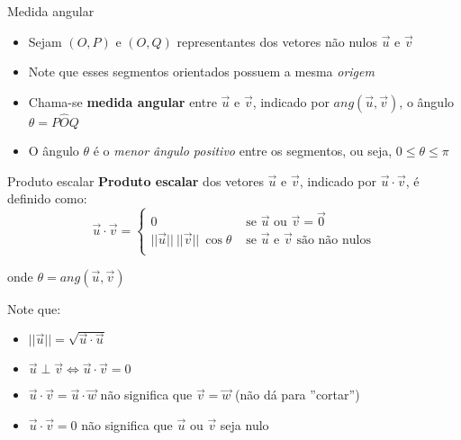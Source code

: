 \begin{frame}{Medida angular}
    \begin{itemize}
        \item Sejam \((O,P)\) e \((O,Q)\) representantes dos vetores não nulos \(\vec{u}\) e \(\vec{v}\)
        \item Note que esses segmentos orientados possuem a mesma \textit{origem}
        \item Chama-se \textbf{medida angular} entre \(\vec{u}\) e \(\vec{v}\), indicado por \(ang(\vec{u},\vec{v})\), o ângulo \(\theta=P\hat{O}Q\)
        \item O ângulo \(\theta\) é o \textit{menor ângulo positivo} entre os segmentos, ou seja, \( 0 \leq \theta \leq \pi\)
    \end{itemize}

    \begin{center}
    \end{center}

\end{frame}

\begin{frame}{Produto escalar}
    \textbf{Produto escalar} dos vetores \(\vec{u}\) e \(\vec{v}\), indicado por \(\vec{u}\cdot\vec{v}\), é definido como:
    \[
        \vec{u}\cdot\vec{v}=
        \begin{cases}
            0 &\text{ se } \vec{u} \text{ ou } \vec{v} = \vec{0} \\
            ||\vec{u}||~||\vec{v}|| ~\cos{\theta} & \text{ se } \vec{u} \text{ e } \vec{v} \text{ são não nulos}\\
        \end{cases}
    \]

    onde \(\theta = ang(\vec{u},\vec{v})\)

    Note que:
    \begin{itemize}
        \item \(||\vec{u}|| = \sqrt{\vec{u}\cdot\vec{u}}\)
        \item \(\vec{u} \perp \vec{v} \Leftrightarrow \vec{u}\cdot\vec{v}=0\)
        \item \(\vec{u}\cdot\vec{v} = \vec{u}\cdot\vec{w}\) não significa que \(\vec{v}=\vec{w}\) (não dá para ''cortar'')
        \item \(\vec{u}\cdot\vec{v}=0\) não significa que \(\vec{u}\) ou \(\vec{v}\) seja nulo
    \end{itemize}
\end{frame}

